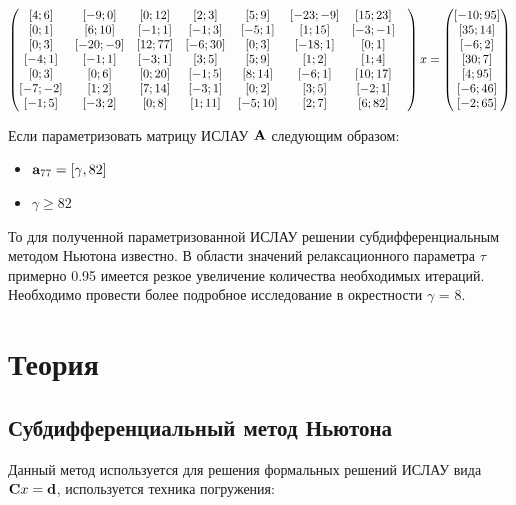 \documentclass[12pt,a4paper]{scrartcl}
\begin{document}
\begin{equation}
\centering
\begin{pmatrix}
[4; 6] & [-9; 0]& [0; 12]& [2; 3]& [5; 9] &[-23;-9]& [15; 23] &\\
[0; 1] & [6; 10] & [-1; 1]& [-1; 3]& [-5; 1]& [1; 15]& [-3;-1] &\\
[0; 3]& [-20;-9]& [12; 77]& [-6; 30]& [0; 3] &[-18; 1]& [0; 1] &\\
[-4; 1] & [-1; 1] &[-3; 1] &[3; 5] &[5; 9] &[1; 2] &[1; 4]\\
[0; 3] &[0; 6] &[0; 20] &[-1; 5] &[8; 14] &[-6; 1] &[10; 17]\\
[-7;-2] &[1; 2] &[7; 14] &[-3; 1] &[0; 2] &[3; 5] &[-2; 1]\\
[-1; 5] &[-3; 2] &[0; 8] &[1; 11] &[-5; 10] &[2; 7] &[6; 82]
\end{pmatrix} x = 
\begin{pmatrix}
[-10; 95]\\
[35; 14]\\
[-6; 2]\\
[30; 7]\\
[4; 95]\\
[-6; 46]\\
[-2; 65]
\end{pmatrix}
\end{equation}

Если параметризовать матрицу ИСЛАУ $\bold{A}$ следующим образом:

\begin{itemize}
\item   $\bold{a}_{77} = [\gamma, 82]$
\item $\gamma \geq 82$ 
\end{itemize}

То для полученной параметризованной ИСЛАУ решении субдифференциальным методом Ньютона известно. В области значений релаксационного параметра $\tau$ примерно 0.95 имеется резкое увеличение количества необходимых итераций.
Необходимо провести более подробное исследование в окрестности $\gamma$ = 8.

\section {Теория}

\subsection {Субдифференциальный метод Ньютона}

Данный метод используется для решения формальных решений ИСЛАУ вида $\bold{C}x = \bold{d}$, используется техника погружения:
\end{document}
